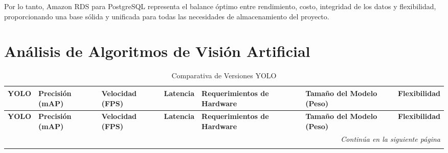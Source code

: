 Por lo tanto, Amazon RDS para PostgreSQL representa el balance óptimo entre rendimiento, costo, integridad de los datos y flexibilidad, proporcionando una base sólida y unificada para todas las necesidades de almacenamiento del proyecto.






\section{Análisis de Algoritmos de Visión Artificial}

\renewcommand{\arraystretch}{1.5}
\begin{longtable}{|p{1.8cm}|p{2cm}|p{2cm}|p{1.8cm}|p{3cm}|p{2cm}|p{2.3cm}|}
\caption{Comparativa de Versiones YOLO} \label{tab:comparativa_yolo} \\

\hline
\textbf{YOLO} & \textbf{Precisión (mAP)} & \textbf{Velocidad (FPS)} & \textbf{Latencia} & \textbf{Requerimientos de Hardware} & \textbf{Tamaño del Modelo (Peso)} & \textbf{Flexibilidad} \\
\hline
\endfirsthead

\hline
\textbf{YOLO} & \textbf{Precisión (mAP)} & \textbf{Velocidad (FPS)} & \textbf{Latencia} & \textbf{Requerimientos de Hardware} & \textbf{Tamaño del Modelo (Peso)} & \textbf{Flexibilidad} \\
\hline
\endhead

\hline
\multicolumn{7}{r}{\textit{Continúa en la siguiente página}} \\
\endfoot

\hline
\endlastfoot


\end{longtable}

